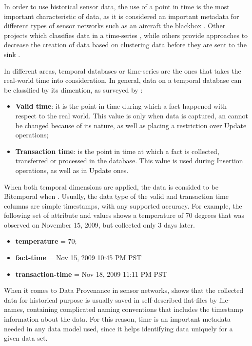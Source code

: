 In order to use historical sensor data, the use of a point in time is the most
important characteristic of data, as it is considered an important metadata
for different types of sensor networks such as an aircraft the blackbox
\cite{sn-exemple-blackbox}. Other projects which classifies data in a
time-series \cite{sn-time-series-example}, while others provide approaches to
decrease the creation of data based on clustering data before they are sent to
the sink \cite{sn-time-series}.

In different areas, temporal databases or time-series are the ones that takes
the real-world time into consideration. In general, data on a temporal
database can be classified by its dimention, as surveyed by \cite{db-temporal}:

\begin{itemize}
  \item \textbf{Valid time}: it is the point in time during which a fact
  happened with respect to the real world. This value is only when data is captured, an
  cannot be changed because of its nature, as well as placing a restriction over
  Update operations;
  \item \textbf{Transaction time}: is the point in time at which a fact is
  collected, transferred or processed in the database. This value is used
  during Insertion operations, as well as in Update ones.
\end{itemize}

When both temporal dimensions are applied, the data is consided to be 
Bitemporal when \cite{db-temporal}. Usually, the data type of the valid and
transaction time columns are simple timestamps, with any supported accuracy.
For example, the following set of attribute and values shows a temperature of
70 degrees that was observed on November 15, 2009, but collected only 3 days
later.

\begin{itemize}
  \item \textbf{temperature} = 70;
  \item \textbf{fact-time} = Nov 15, 2009 10:45 PM PST
  \item \textbf{transaction-time} = Nov 18, 2009 11:11 PM PST
\end{itemize}

When it comes to Data Provenance in sensor networks, \cite{sn-provenance}
shows that the collected data for historical purpose is usually saved in
self-described flat-files by file-names, containing complicated naming
conventions that includes the timestamp information about the data. For this
reason, time is an important metadata needed in any data model used, since it 
helps identifying data uniquely for a given data set.


